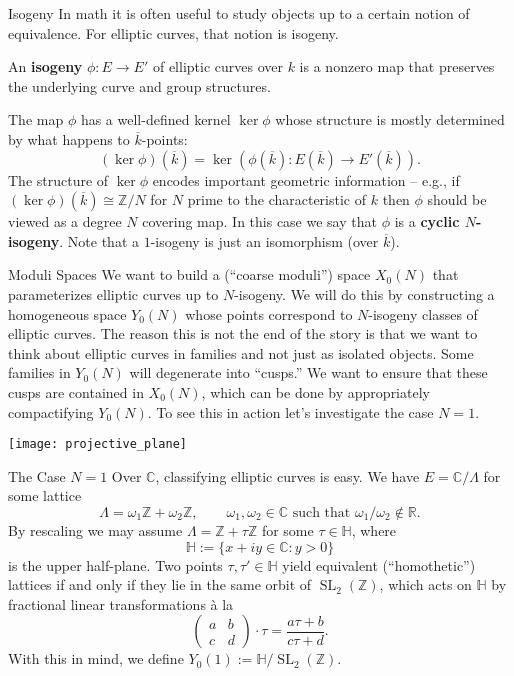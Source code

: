 \documentclass[aspectratio=1610]{beamer}
\newcommand{\C}{\mathbb{C}}
\newcommand{\HH}{\mathbb{H}}
\newcommand{\R}{\mathbb{R}}
\newcommand{\Z}{\mathbb{Z}}
\newcommand{\df}{\dfrac}
\newcommand{\iso}{\cong}
\newcommand{\ov}{\overline}
\DeclareMathOperator{\SL}{SL}
\begin{document}
\begin{frame}{Isogeny}
In math it is often useful to study objects up to a certain notion of equivalence. For elliptic curves, that notion is isogeny. 
\begin{definition}
An \textbf{isogeny} $\phi: E\to E'$ of elliptic curves over $k$ is a nonzero map that preserves the underlying curve and group structures.
\end{definition}
The map $\phi$ has a well-defined kernel $\ker\phi$ whose structure is mostly determined by what happens to $\ov{k}$-points:
$$(\ker\phi)(\ov{k})=\ker(\phi(\ov{k}): E(\ov{k})\to E'(\ov{k})).$$
The structure of $\ker\phi$ encodes important geometric information -- e.g., if $(\ker\phi)(\ov{k})\iso\Z/N$ for $N$ prime to the characteristic of $k$ then $\phi$ should be viewed as a degree $N$ covering map. In this case we say that $\phi$ is a \textbf{cyclic $N$-isogeny}. Note that a $1$-isogeny is just an isomorphism (over $\ov{k}$).
\end{frame}

\begin{frame}{Moduli Spaces}
We want to build a (``coarse moduli'') space $X_0(N)$ that parameterizes elliptic curves up to $N$-isogeny. We will do this by constructing a homogeneous space $Y_0(N)$ whose points correspond to $N$-isogeny classes of elliptic curves. The reason this is not the end of the story is that we want to think about elliptic curves in families and not just as isolated objects. Some families in $Y_0(N)$ will degenerate into ``cusps.'' We want to ensure that these cusps are contained in $X_0(N)$, which can be done by appropriately compactifying $Y_0(N)$. To see this in action let's investigate the case $N=1$.

\begin{center}
\texttt{[image: projective\_plane]}
\end{center}
\end{frame}

\begin{frame}{The Case $N=1$}
Over $\C$, classifying elliptic curves is easy. We have $E=\C/\Lambda$ for some lattice
$$\Lambda=\omega_1\Z+\omega_2\Z,\qquad\omega_1,\omega_2\in\C\textrm{ such that }\omega_1/\omega_2\not\in\R.$$
By rescaling we may assume $\Lambda=\Z+\tau\Z$ for some $\tau\in\HH$, where
$$\HH:=\{x+iy\in\C : y>0\}$$
is the upper half-plane. Two points $\tau,\tau'\in\HH$ yield equivalent (``homothetic'') lattices if and only if they lie in the same orbit of $\SL_2(\Z)$, which acts on $\HH$ by fractional linear transformations \`{a} la
\begin{equation*}
\begin{pmatrix}
a & b \\
c & d
\end{pmatrix}
\cdot\tau
=\df{a\tau+b}{c\tau+d}.
\end{equation*}
With this in mind, we define $Y_0(1):=\HH/\SL_2(\Z)$.
\end{frame}
\end{document}
